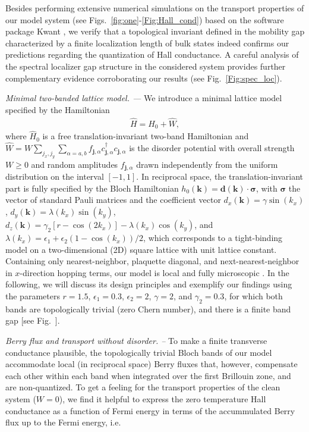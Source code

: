 \documentclass[aps,prb,amsmath,amssymb,twocolumn, superscriptaddress]{revtex4-2}
\begin{document}
Besides performing extensive numerical simulations on the transport properties of our model system (see Figs.~\ref{fig:one}-\ref{Fig:Hall_cond}) based on the software package Kwant \cite{Kwant, Kwant_Mumps, KPM_tools}, we verify that a topological invariant defined in the mobility gap \cite{Smatrix_pumping, Smatrix_pumping_2, Scattering_invariants} characterized by a finite localization length of bulk states indeed confirms our predictions regarding the quantization of Hall conductance. A careful analysis of the spectral localizer gap structure \cite{Spec_loc_1, Spec_loc_2, Spec_loc_3, Spec_loc_4, Spec_loc_5, spec_loc_mobility_gap} in the considered system provides further complementary evidence corroborating our results (see Fig.~\ref{Fig:spec_loc}).  


{\it Minimal two-banded lattice model. ---}
We introduce a minimal lattice model specified by the Hamiltonian 
\begin{align}
\hat H = \hat H_0 + \hat W,
\label{eq:ham}
\end{align}
where $\hat H_0$ is a free translation-invariant two-band Hamiltonian and $\hat W = W\sum_{j_x, j_y} \sum_{\alpha = a,b} f_{\bm j, \alpha} c_{\bm j, \alpha}^\dagger c_{\bm j, \alpha}$ is the disorder potential with overall strength $W \ge 0$ and random amplitudes $f_{\bm j, \alpha}$ drawn independently from the uniform distribution on the interval $[-1,1]$. In reciprocal space, the translation-invariant part is fully specified by the Bloch Hamiltonian $h_0(\bm k ) = \bm d(\bm k) \cdot \bm \sigma$, with $\bm \sigma$ the vector of standard Pauli matrices and the coefficient vector $d_x(\bm k) = \gamma \sin(k_x)$, $d_y(\bm k) = \lambda(k_x) \sin(k_y)$, $d_z(\bm k) = \gamma_2[r - \cos(2 k_x)] - \lambda(k_x) \cos(k_y)$, and $\lambda(k_x) =  \epsilon_1 + \epsilon_2 (1 - \cos(k_x))/2 $, which corresponds to a tight-binding model on a two-dimensional (2D) square lattice with unit lattice constant. Containing only nearest-neighbor, plaquette diagonal, and next-nearest-neighbor in $x$-direction hopping terms, our model is local and fully microscopic \cite{Supplemental}. In the following, we will discuss its design principles and exemplify our findings using the parameters $r = 1.5$, $\epsilon_1 = 0.3$, $\epsilon_2 = 2$, $\gamma  =2$, and $\gamma_2 = 0.3$, for which both bands are topologically trivial (zero Chern number), and there is a finite band gap [see Fig.~]. 


{\it Berry flux and transport without disorder. --} To make a finite transverse conductance plausible, the topologically trivial Bloch bands of our model accommodate local (in reciprocal space) Berry fluxes that, however, compensate each other within each band when integrated over the first Brillouin zone, and are non-quantized. To get a feeling for the transport properties of the clean system ($W=0$), we find it helpful to express the zero temperature Hall conductance as a function of Fermi energy in terms of the accummulated Berry flux up to the Fermi energy, i.e.
\end{document}
